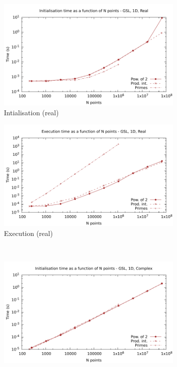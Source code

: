 \documentclass[12pt, a4paper]{article}
\begin{document}
\begin{figure}[H]
\captionsetup{width=0.8\linewidth}
\centering
\begin{subfigure}{.5\textwidth}
\centering
\includegraphics[width=.9\linewidth]{graphs/1d-gsl-init-r.pdf}
\caption{Intialisation (real)}
\label{1DGSLRI}
\end{subfigure}%
\begin{subfigure}{.5\textwidth}
\centering
\includegraphics[width=.9\linewidth]{graphs/1d-gsl-exec-r.pdf}
\caption{Execution (real)}
\label{1DGSLR}
\end{subfigure}\\
\begin{subfigure}{.5\textwidth}
\centering
\includegraphics[width=.9\linewidth]{graphs/1d-gsl-init-c.pdf}

\end{subfigure}
\end{figure}
\end{document}
